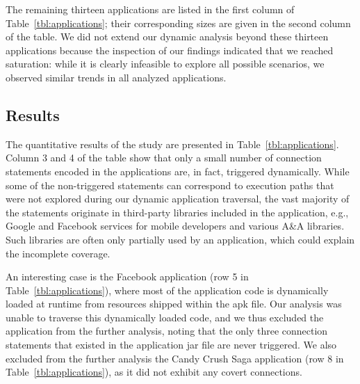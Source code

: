 The remaining thirteen applications are listed in the first column of Table~\ref{tbl:applications}; their corresponding sizes are given in the second column of the table. 
We did not extend our dynamic analysis beyond these thirteen applications because the inspection of our findings indicated that we reached saturation: while it is clearly infeasible to explore all possible scenarios, we observed similar trends in all analyzed applications. 

\subsection{Results}
The quantitative results of the study are presented in %
Table~\ref{tbl:applications}. 
Column 3 and 4 of the table show that only a small number of connection statements encoded in the applications are, in fact, triggered dynamically. 
While some of the non-triggered statements can correspond to execution paths that were not explored during our dynamic application traversal, the vast majority of the statements originate in  
third-party libraries included in the application, e.g., Google and Facebook services for mobile developers and various A\&A libraries. 
Such libraries are often only partially used by an application, which could explain the incomplete coverage.  

An interesting case is the Facebook application (row 5 in Table~\ref{tbl:applications}), where most of the application code is dynamically loaded at runtime from resources shipped within the apk file. 
Our analysis was unable to traverse this dynamically loaded code, and we thus excluded the application from the further analysis, noting that the only three connection statements that existed in the application jar file are never triggered. We also excluded from the further analysis the Candy Crush Saga application (row 8 in Table~\ref{tbl:applications}), as it did not exhibit any covert connections.

